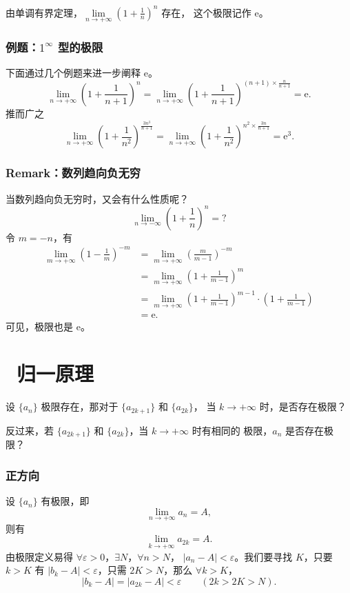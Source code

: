 \documentclass[UTF8,11pt]{ctexart}
\theoremstyle{cnthm}
\begin{document}
由单调有界定理，$\displaystyle\lim\limits_{n\to+\infty}\left(1+\frac1n\right)^n$ 存在，
这个极限记作 $\mathrm e$。

\subsubsection*{例题：$1^\infty$ 型的极限}

下面通过几个例题来进一步阐释 $\mathrm e$。
\[
\lim_{n\to+\infty}\left(1+\frac{1}{n+1}\right)^n
=\lim_{n\to+\infty}\left(1+\frac{1}{n+1}\right)^{(n+1)\times\frac{n}{n+1}}
=\mathrm e .
\]
推而广之
\[
\lim_{n\to+\infty}\left(1+\frac{1}{n^2}\right)^{\frac{3n^3}{n+1}}
=\lim_{n\to+\infty}\left(1+\frac{1}{n^2}\right)^{n^2\times\frac{3n}{n+1}}
=\mathrm e^3 .
\]

\subsubsection*{Remark：数列趋向负无穷}

当数列趋向负无穷时，又会有什么性质呢？
\[
\lim_{n\to-\infty}\left(1+\frac1n\right)^n=?
\]
令 $m=-n$，有
\[
\begin{aligned}
\lim_{m\to+\infty}\left(1-\frac1m\right)^{-m}
&=\lim_{m\to+\infty}\left(\frac{m}{m-1}\right)^{-m}\\
&=\lim_{m\to+\infty}\left(1+\frac{1}{m-1}\right)^m\\
&=\lim_{m\to+\infty}\left(1+\frac{1}{m-1}\right)^{m-1}
\cdot\left(1+\frac{1}{m-1}\right)\\
&=\mathrm e .
\end{aligned}
\]
可见，极限也是 $\mathrm e$。

\section{\ 归一原理}

设 $\{a_n\}$ 极限存在，那对于 $\{a_{2k+1}\}$ 和 $\{a_{2k}\}$，
当 $k\to+\infty$ 时，是否存在极限？

反过来，若 $\{a_{2k+1}\}$ 和 $\{a_{2k}\}$，当 $k\to+\infty$ 时有相同的
极限，$a_n$ 是否存在极限？

\subsubsection*{正方向}

设 $\{a_n\}$ 有极限，即
\[
\lim_{n\to+\infty}a_n=A,
\]
则有
\[
\lim_{k\to+\infty}a_{2k}=A .
\]
由极限定义易得
$\forall\varepsilon>0$，$\exists N$，$\forall n>N$，
$|a_n-A|<\varepsilon$。我们要寻找 $K$，只要 $k>K$ 有
$|b_k-A|<\varepsilon$，只需 $2K>N$，那么
$\forall k>K$，
\[
|b_k-A|=|a_{2k}-A|<\varepsilon\qquad(2k>2K>N).
\]
\end{document}
